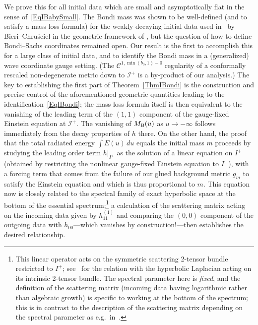 \documentclass[reqno,11pt,letterpaper]{amsart}
\numberwithin{equation}{section}
\numberwithin{figure}{section}
\theoremstyle{definition}
\theoremstyle{remark}
\newcommand{\mc}{\mathcal}
\newcommand{\cC}{\mc C}
\newcommand{\ms}{\mathscr}
\newcommand{\scri}{\ms I}
\begin{document}
We prove this for all initial data which are small and asymptotically flat in the sense of~\eqref{EqIBabySmall}. The Bondi mass was shown to be well-defined (and to satisfy a mass loss formula) for the weakly decaying initial data used in~\cite{BieriZipserStability} by Bieri--Chru\'sciel \cite{BieriChruscielADMBondi} in the geometric framework of \cite{ChristodoulouKlainermanStability}, but the question of how to define Bondi--Sachs coordinates remained open. Our result is the first to accomplish this for a large class of initial data, and to identify the Bondi mass in a (generalized) wave coordinate gauge setting. (The $\cC^{1,\min(b_0,1)-0}$ regularity of a conformally rescaled non-degenerate metric down to $\scri^+$ is a by-product of our analysis.) The key to establishing the first part of Theorem~\ref{ThmIBondi} is the construction and precise control of the aforementioned geometric quantities leading to the identification~\eqref{EqIBondi}; the mass loss formula itself is then equivalent to the vanishing of the leading term of the $(1,1)$ component of the gauge-fixed Einstein equation at $\scri^+$. The vanishing of $M_{\rm B}(u)$ as $u\to-\infty$ follows immediately from the decay properties of $h$ there. On the other hand, the proof that the total radiated energy $\int E(u)\,d u$ equals the initial mass $m$ proceeds by studying the leading order term $h|_{I^+}$ as the solution of a linear equation on $I^+$ (obtained by restricting the nonlinear gauge-fixed Einstein equation to $I^+$), with a forcing term that comes from the failure of our glued background metric $g_m$ to satisfy the Einstein equation and which is thus proportional to $m$. This equation now is closely related to the spectral family of exact hyperbolic space at the bottom of the essential spectrum;\footnote{This linear operator acts on the symmetric scattering 2-tensor bundle restricted to $I^+$; see~\cite{HadfieldSymm} for the relation with the hyperbolic Laplacian acting on its intrinsic 2-tensor bundle. The spectral parameter here is \emph{fixed}, and the definition of the scattering matrix (incoming data having logarithmic rather than algebraic growth) is specific to working at the bottom of the spectrum; this is in contrast to the description of the scattering matrix depending on the spectral parameter as e.g.\ in~\cite{GrahamZworskiScattering}.} a calculation of the scattering matrix acting on the incoming data given by $h_{1 1}^{(1)}$ and comparing the $(0,0)$ component of the outgoing data with $h_{0 0}$---which vanishes by construction!---then establishes the desired relationship.
\end{document}
